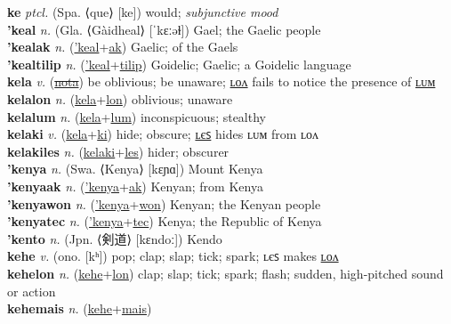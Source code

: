 \textbf{ke} \textit{ptcl.} (Spa. ⟨que⟩ [ke])
would; \textit{subjunctive mood} \label{ke} \\
\textbf{'keal} \textit{n.} (Gla. ⟨Gàidheal⟩ [ˈkɛːəɫ])
Gael; the Gaelic people \label{'keal} \\
\textbf{'kealak} \textit{n.} (\hyperref['keal]{'keal}+\hyperref[ak]{ak})
Gaelic; of the Gaels \label{'kealak} \\
\textbf{'kealtilip} \textit{n.} (\hyperref['keal]{'keal}+\hyperref[tilip]{tilip})
Goidelic; Gaelic; a Goidelic language \label{'kealtilip} \\
\textbf{kela} \textit{v.} (\hyperref[nota]{\sout{nota}})
be oblivious; be unaware; \hyperref[kelalon]{ʟᴏᴧ} fails to notice the presence of \hyperref[kelalum]{ʟᴜᴍ} \label{kela} \\
\textbf{kelalon} \textit{n.} (\hyperref[kela]{kela}+\hyperref[lon]{lon})
oblivious; unaware \label{kelalon} \\
\textbf{kelalum} \textit{n.} (\hyperref[kela]{kela}+\hyperref[lum]{lum})
inconspicuous; stealthy \label{kelalum} \\
\textbf{kelaki} \textit{v.} (\hyperref[kela]{kela}+\hyperref[ki]{ki})
hide; obscure; \hyperref[kelakiles]{ʟєꜱ} hides ʟᴜᴍ from ʟᴏᴧ \label{kelaki} \\
\textbf{kelakiles} \textit{n.} (\hyperref[kelaki]{kelaki}+\hyperref[les]{les})
hider; obscurer \label{kelakiles} \\
\textbf{'kenya} \textit{n.} (Swa. ⟨Kenya⟩ [kɛɲɑ])
Mount Kenya \label{'kenya} \\
\textbf{'kenyaak} \textit{n.} (\hyperref['kenya]{'kenya}+\hyperref[ak]{ak})
Kenyan; from Kenya \label{'kenyaak} \\
\textbf{'kenyawon} \textit{n.} (\hyperref['kenya]{'kenya}+\hyperref[won]{won})
Kenyan; the Kenyan people \label{'kenyawon} \\
\textbf{'kenyatec} \textit{n.} (\hyperref['kenya]{'kenya}+\hyperref[tec]{tec})
Kenya; the Republic of Kenya \label{'kenyatec} \\
\textbf{'kento} \textit{n.} (Jpn. ⟨剣道⟩ [kɛndoː])
Kendo \label{'kento} \\
\textbf{kehe} \textit{v.} (ono. [kʰ])
pop; clap; slap; tick; spark; ʟєꜱ makes \hyperref[kehelon]{ʟᴏᴧ} \label{kehe} \\
\textbf{kehelon} \textit{n.} (\hyperref[kehe]{kehe}+\hyperref[lon]{lon})
clap; slap; tick; spark; flash; sudden, high-pitched sound or action \label{kehelon} \\
\textbf{kehemais} \textit{n.} (\hyperref[kehe]{kehe}+\hyperref[mais]{mais})

